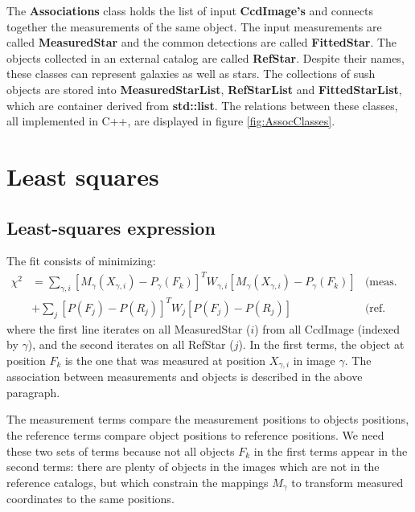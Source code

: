 \documentclass[a4paper,12pt]{scrartcl}
\newcommand{\ClName}[1]{{\bf #1}}
\def\bf{\normalfont\bfseries}
\begin{document}
The \ClName{Associations} class holds the list of input
\ClName{CcdImage's} and connects together the measurements of the same
object. The input measurements are called \ClName{MeasuredStar} and
the common detections are called \ClName{FittedStar}. The objects
collected in an external catalog are called \ClName{RefStar}.
Despite their
names, these classes can represent galaxies as well as stars. The
collections of sush objects are stored into \ClName{MeasuredStarList},
\ClName{RefStarList} 
and \ClName{FittedStarList}, which are container derived from \ClName
{std::list}. The relations between these classes, all implemented in C++,
are displayed in figure \ref{fig:AssocClasses}.


\section{Least squares \label{sec:ls}}
\subsection{Least-squares expression}
The fit consists of minimizing:
\begin{align}
\chi^2 & =  \sum_{\gamma,i}  [M_\gamma(X_{\gamma,i})-P_{\gamma}(F_k) ]^T W_{\gamma,i}  [M_\gamma(X_{\gamma,i})-P_{\gamma}(F_k) ] & \textrm{(meas. terms)} \nonumber \\
         &+\sum_j [P(F_j)-P(R_j)]^T W_j [P(F_j)-P(R_j)] & \textrm{(ref. terms)} \label{eq:chi2}
\end{align}
where the first line iterates on all MeasuredStar ($i$) from all
CcdImage (indexed by $\gamma$), and the second iterates on all RefStar
($j$). In the first terms, the object at position $F_k$ is the one
that was measured at position $X_{\gamma,i}$ in image $\gamma$. 
The association between measurements and objects is 
described in the above paragraph. 

    The measurement terms compare the measurement positions
to objects positions, the reference terms compare object positions 
to reference positions. We need these two sets of terms
because not all objects $F_k$ in the first terms appear
in the second terms: there are plenty of objects in the images
which are not in the reference catalogs, but which constrain the
mappings $M_\gamma$ to transform measured coordinates to the
same positions. 
\end{document}

